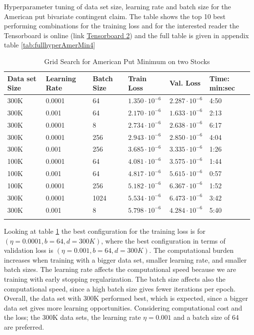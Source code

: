 \begin{table}[th]
\caption{Grid Search for American Put Minimum on two Stocks}{Hyperparameter tuning of data set size, learning rate and batch size for the American put bivariate contingent claim. The table shows the top 10 best performing combinations for the training loss and for the interested reader the Tensorboard is online (link \href{https://tensorboard.dev/experiment/ECWCP8nPTJWoXKVdBcQSaw/#scalars}{Tensorboard 2}) and the full table is given in appendix table \ref{tab:fullhyperAmerMin4}}
\label{tab:hyperAmerMin1}
\centering
\begin{tabular}{llllll}
\toprule
\textbf{Data set Size} & \textbf{Learning Rate} & \textbf{Batch Size} & \textbf{Train Loss} & \textbf{Val. Loss} & \textbf{Time: min:sec} \\
\midrule
300K     & 0.0001 & 64    & $1.350 \cdot 10^{-6}$   & $2.287 \cdot 10^{-6}$ & 4:50 \\ 
300K     & 0.001 & 64     & $2.170 \cdot 10^{-6}$   & $1.633 \cdot 10^{-6}$ & 2:13 \\ 
300K     & 0.0001 & 8     & $2.734 \cdot 10^{-6}$   & $2.638 \cdot 10^{-6}$ & 6:17\\ 
300K     & 0.0001 & 256   & $2.943 \cdot 10^{-6}$   & $2.850 \cdot 10^{-6}$ & 4:04\\ 
300K     & 0.001 & 256    & $3.685 \cdot 10^{-6}$   & $3.335 \cdot 10^{-6}$ & 1:26\\ 
100K     & 0.0001 & 64    & $4.081 \cdot 10^{-6}$   & $3.575 \cdot 10^{-6}$ & 1:44\\ 
100K     & 0.001 & 64     & $4.817 \cdot 10^{-6}$   & $5.615 \cdot 10^{-6}$ & 0:57\\ 
100K     & 0.0001 & 256   & $5.182 \cdot 10^{-6}$   & $6.367 \cdot 10^{-6}$ & 1:52\\ 
300K     & 0.0001 & 1024  & $5.534 \cdot 10^{-6}$   & $6.473 \cdot 10^{-6}$ & 3:42\\ 
300K     & 0.001 & 8      & $5.798 \cdot 10^{-6}$   & $4.284 \cdot 10^{-6}$ & 5:40\\ 
\bottomrule\\
\end{tabular}
\end{table}

Looking at table \ref{tab:hyperAmerMin1} the best configuration for the training loss is for $(\eta=0.0001, b=64, d=300K)$, where the best configuration in terms of validation loss is $(\eta=0.001, b=64, d=300K)$. The computational burden increases when training with a bigger data set, smaller learning rate, and smaller batch sizes. The learning rate affects the computational speed because we are training with early stopping regularization. The batch size affects also the computational speed, since a high batch size gives fewer iterations per epoch. Overall, the data set with 300K performed best, which is expected, since a bigger data set gives more learning opportunities. Considering computational cost and the loss; the 300K data sets, the learning rate $\eta=0.001$ and a batch size of 64 are preferred.\\

